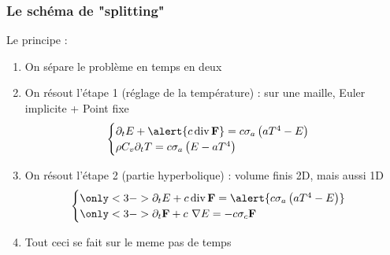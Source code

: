 \begin{frame}
  \frametitle{Le schéma de "splitting"}
  Le principe :
  \footnotesize
  \begin{enumerate}
    \item<1-> On sépare le problème en temps en deux
    \item<2-> On résout l'étape 1 (réglage de la température) : sur une maille, Euler implicite + Point fixe
    $$     \begin{cases}
      \partial_tE + \alert{c \operatorname {div} \bvec F} = c\sigma_a\left(aT^4-E\right)\\
      \rho C_v \partial_t T = c \sigma_a \left(E-aT^4\right) 
     \end{cases} $$
    \item<3-> On résout l'étape 2 (partie hyperbolique) : volume finis 2D, mais aussi 1D
    $$     \begin{cases}
      \only<3->{\partial_tE + c \operatorname {div} \bvec F = \alert{c\sigma_a\left(aT^4-E\right)}}\\
      \only<3->{\partial_t\bvec{F} + c \ \nabla E = -c\sigma_c \bvec{F}} \\
     \end{cases} $$
    \item<4> \alert {Tout ceci se fait sur le meme pas de temps}
  \end{enumerate}

\end{frame}


